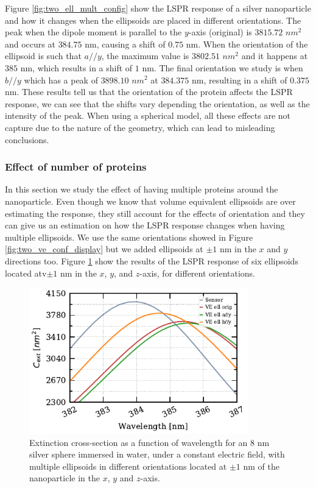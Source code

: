Figure \ref{fig:two_ell_mult_config} show the LSPR response of a silver nanoparticle and how it changes when the ellipsoids 
are placed in different orientations. The peak when the dipole moment is parallel to the $y$-axis (original)
is $3815.72$ $nm^2$ and occurs at $384.75$ nm, causing a shift of $0.75$ nm. When the orientation of the ellipsoid 
is such that $a//y$, the maximum value is $3802.51$ $nm^2$ and it happens at $385$ nm, which results in a shift of 
$1$ nm. The final orientation we study is when $b//y$ which has a peak of $3898.10$ $nm^2$ at $384.375$ nm, resulting 
in a shift of $0.375$ nm. These results tell us that the orientation of the protein affects the LSPR response, we can 
see that the shifts vary depending the orientation, as well as the intensity of the peak. When using a spherical model, 
all these effects are not capture due to the nature of the geometry, which can lead to misleading conclusions.

\subsubsection{Effect of number of proteins}

In this section we study the effect of having multiple proteins around the nanoparticle. Even though we know 
that volume equivalent ellipsoids are over estimating the response, they still account for the effects of 
orientation and they can give us an estimation on how the LSPR response changes when having multiple 
ellipsoids. We use the same orientations showed in Figure \ref{fig:two_ve_conf_display} but we added ellipsoids 
at $\pm 1$ nm in the $x$ and $y$ directions too. Figure \ref{fig:mult_ell} show the results of the LSPR response 
of six ellipsoids located atv$\pm 1$ nm in the $x$, $y$, and $z$-axis, for different orientations. 
 
\begin{figure} %
    \centering
    \includegraphics[width=0.85\textwidth]{six_ve_ell_mult_config.pdf} 
    \caption{Extinction cross-section as a function of wavelength for an $8$ nm
            silver sphere immersed in water, under a constant electric field, with multiple ellipsoids in different orientations 
            located at $\pm 1$ nm of the nanoparticle in the $x$, $y$ and $z$-axis.}
    \label{fig:mult_ell}
 \end{figure}

